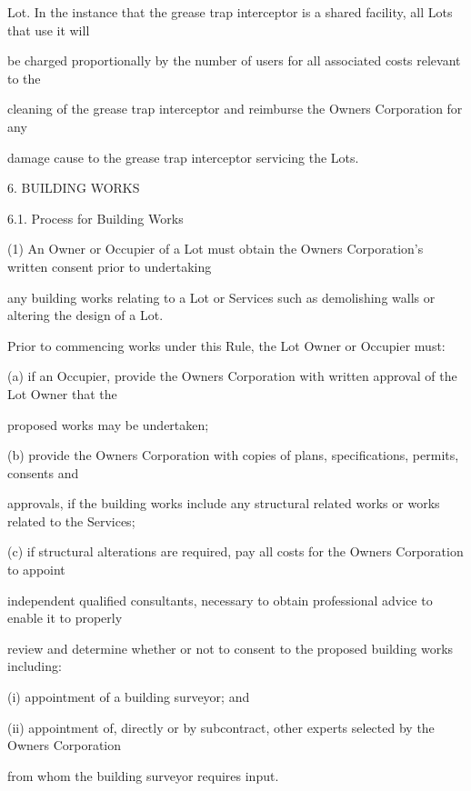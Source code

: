 \documentclass{article}
\begin{document}
{\fontsize{10.02}{1}Lot. In the instance that the grease trap interceptor is a shared facility, all Lots that use it will }

{\fontsize{10.02}{1}be charged proportionally by the number of users for all associated costs relevant to the }

{\fontsize{10.02}{1}cleaning of the grease trap interceptor and reimburse the Owners Corporation for any }

{\fontsize{10.02}{1}damage cause to the grease trap interceptor servicing the Lots. }


{\fontsize{9.99}{1}6. BUILDING WORKS }

{\fontsize{9.99}{1}6.1. Process for Building Works }

{\fontsize{9.962}{1}(1) An Owner or Occupier of a Lot must obtain the Owners Corporation’s written consent prior to undertaking }

{\fontsize{10.02}{1}any building works relating to a Lot or Services such as demolishing walls or altering the design of a Lot. }

{\fontsize{10.02}{1}Prior to commencing works under this Rule, the Lot Owner or Occupier must: }

{\fontsize{9.962}{1}(a) if an Occupier, provide the Owners Corporation with written approval of the Lot Owner that the }

{\fontsize{10.02}{1}proposed works may be undertaken; }

{\fontsize{9.962}{1}(b) provide the Owners Corporation with copies of plans, specifications, permits, consents and }

{\fontsize{10.02}{1}approvals, if the building works include any structural related works or works related to the Services; }

{\fontsize{9.962}{1}(c) if structural alterations are required, pay all costs for the Owners Corporation to appoint }

{\fontsize{10.02}{1}independent qualified consultants, necessary to obtain professional advice to enable it to properly }

{\fontsize{10.02}{1}review and determine whether or not to consent to the proposed building works including: }

{\fontsize{9.962}{1}(i) appointment of a building surveyor; and }

{\fontsize{9.962}{1}(ii) appointment of, directly or by subcontract, other experts selected by the Owners Corporation }

{\fontsize{10.02}{1}from whom the building surveyor requires input. }
\end{document}
